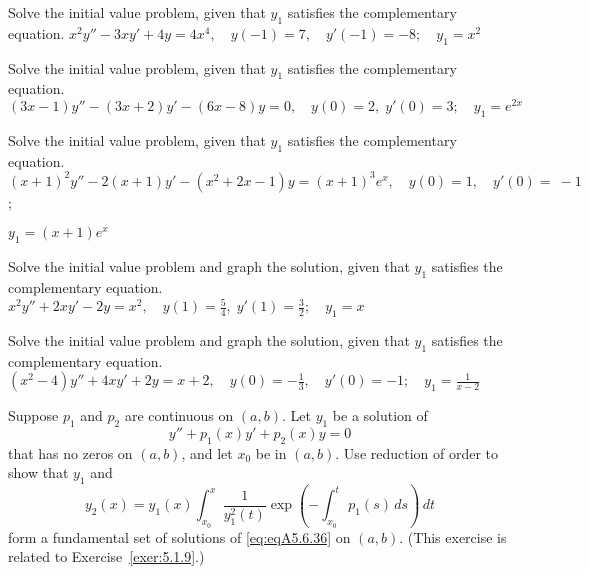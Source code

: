 \documentclass{ximera}
\begin{document}
\begin{problem}\label{exer:5.6.31}
Solve the
initial value problem, given that $y_1$ satisfies the complementary
equation. $x^2y''-3xy'+4y=4x^4,\quad y(-1)=7,\quad  y'(-1)=-8;   \quad y_1=x^2$
\end{problem}

\begin{problem}\label{exer:5.6.32}
Solve the
initial value problem, given that $y_1$ satisfies the complementary
equation. $(3x-1)y''-(3x+2)y'-(6x-8)y=0, \quad   y(0)=2,\;  y'(0)=3;    \quad
y_1=e^{2x}$
\end{problem}

\begin{problem}\label{exer:5.6.33}
Solve the
initial value problem, given that $y_1$ satisfies the complementary
equation. $(x+1)^2y''-2(x+1)y'-(x^2+2x-1)y=(x+1)^3e^x, \quad  y(0)=1,\quad y'(0)=~-1$;

$y_1=(x+1)e^x$
\end{problem}

\begin{problem}\label{exer:5.6.34} Solve the
initial value problem and graph the solution, given that $y_1$
satisfies the complementary equation.
$x^2y''+2xy'-2y=x^2, \quad   y(1)=\frac{5}{4},\;
y'(1)=\frac{3}{2};   \quad y_1=x$
\end{problem}

\begin{problem}\label{exer:5.6.35} Solve the
initial value problem and graph the solution, given that $y_1$
satisfies the complementary equation.
$(x^2-4)y''+4xy'+2y=x+2, \quad  y(0)=-\frac{1}{3},\quad y'(0)=-1;
\quad y_1=\frac{1}{x-2}$
\end{problem}

\begin{problem}\label{exer:5.6.36}
Suppose $p_1$ and $p_2$ are continuous on $(a,b)$. Let $y_1$
be a solution of
\begin{equation}\label{eq:eqA5.6.36}
 y''+p_1(x)y'+p_2(x)y=0
\end{equation}
that has no zeros on $(a,b)$, and let $x_0$ be in $(a,b)$.
Use reduction of order to show that $y_1$ and
$$
y_2(x)=y_1(x)\int^x_{x_0}\frac{1}{y^2_1(t)} \exp
\left(-\int^t_{x_0}p_1(s)\, ds\right)\,dt
$$
form a fundamental set of solutions of \ref{eq:eqA5.6.36} on
$(a,b)$.
(This exercise is related to Exercise~\ref{exer:5.1.9}.)
\end{problem}
\end{document}
